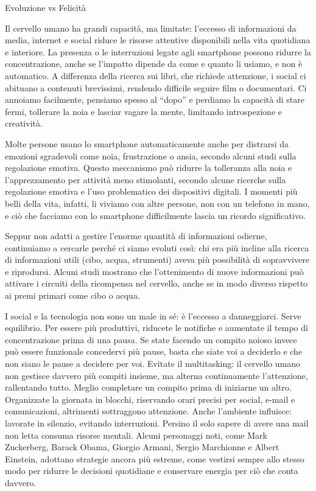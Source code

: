 \documentclass[12pt]{book} %
\begin{document}
\begin{mdframed}[linewidth=1pt]
Evoluzione vs Felicità

Il cervello umano ha grandi capacità, ma limitate: l’eccesso di informazioni da media, internet e social riduce le risorse attentive disponibili nella vita quotidiana e interiore. La presenza o le interruzioni legate agli smartphone possono ridurre la concentrazione, anche se l’impatto dipende da come e quanto li usiamo, e non è automatico. A differenza della ricerca sui libri, che richiede attenzione, i social ci abituano a contenuti brevissimi, rendendo difficile seguire film o documentari. Ci annoiamo facilmente, pensiamo spesso al “dopo” e perdiamo la capacità di stare fermi, tollerare la noia e lasciar vagare la mente, limitando introspezione e creatività.

Molte persone usano lo smartphone automaticamente anche per distrarsi da emozioni sgradevoli come noia, frustrazione o ansia, secondo alcuni studi sulla regolazione emotiva. Questo meccanismo può ridurre la tolleranza alla noia e l'apprezzamento per attività meno stimolanti, secondo alcune ricerche sulla regolazione emotiva e l’uso problematico dei dispositivi digitali. I momenti più belli della vita, infatti, li viviamo con altre persone, non con un telefono in mano, e ciò che facciamo con lo smartphone difficilmente lascia un ricordo significativo.

Seppur non adatti a gestire l’enorme quantità di informazioni odierne, continuiamo a cercarle perché ci siamo evoluti così: chi era più incline alla ricerca di informazioni utili (cibo, acqua, strumenti) aveva più possibilità di sopravvivere e riprodursi. Alcuni studi mostrano che l’ottenimento di nuove informazioni può attivare i circuiti della ricompensa nel cervello, anche se in modo diverso rispetto ai premi primari come cibo o acqua.

I social e la tecnologia non sono un male in sé: è l’eccesso a danneggiarci. Serve equilibrio. Per essere più produttivi, riducete le notifiche e aumentate il tempo di concentrazione prima di una pausa. Se state facendo un compito noioso invece può essere funzionale
concedervi più pause, basta che siate voi a deciderlo e che non siano le pause a decidere per voi. Evitate il multitasking: il cervello umano non gestisce davvero più compiti insieme, ma alterna continuamente l’attenzione, rallentando tutto. Meglio completare un compito prima di iniziarne un altro. Organizzate la giornata in blocchi, riservando orari precisi per social, e-mail e comunicazioni, altrimenti sottraggono attenzione. Anche l’ambiente influisce: lavorate in silenzio, evitando interruzioni. Persino il solo sapere di avere una mail non letta consuma risorse mentali. Alcuni personaggi noti, come Mark Zuckerberg, Barack Obama, Giorgio Armani, Sergio Marchionne e Albert Einstein, adottano strategie ancora più estreme, come vestirsi sempre allo stesso modo per ridurre le decisioni quotidiane e conservare energia per ciò che conta davvero.


\end{mdframed}
\end{document}

